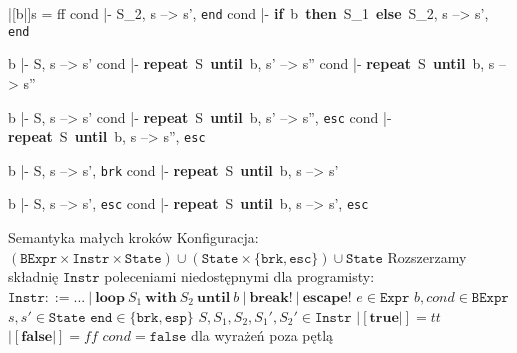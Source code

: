 \documentclass[12pt]{minimal}
\begin{document}
\vspace{5mm}
\inference
{|[b|]s = ff \quad cond |- S_2, s --> s', \texttt{end}}
{cond |- \textbf{if}~b~\textbf{then}~S_1~\textbf{else}~S_2, s --> s', \texttt{end}}

\vspace{5mm}
\inference
{b |- S, s --> s' \quad cond |- \textbf{repeat}~S~\textbf{until}~b, s' --> s''}
{cond |- \textbf{repeat}~S~\textbf{until}~b, s --> s''}

\vspace{5mm}
\inference
{b |- S, s --> s' \quad cond |- \textbf{repeat}~S~\textbf{until}~b, s' --> s'', \texttt{esc}}
{cond |- \textbf{repeat}~S~\textbf{until}~b, s --> s'', \texttt{esc}}

\vspace{5mm}
\inference
{b |- S, s --> s', \texttt{brk}}
{cond |- \textbf{repeat}~S~\textbf{until}~b, s --> s'}

\vspace{5mm}
\inference
{b |- S, s --> s', \texttt{esc}}
{cond |- \textbf{repeat}~S~\textbf{until}~b, s --> s', \texttt{esc}}

\vspace{5mm}

\vspace{5mm}


\vspace{20mm}

{\Huge Semantyka małych kroków}
\newline\newline
Konfiguracja:
$(\texttt{BExpr} \times \texttt{Instr} \times \texttt{State}) 
\cup (\texttt{State} \times \{\texttt{brk}, \texttt{esc}\})
\cup \texttt{State}$ \newline
Rozszerzamy składnię $\texttt{Instr}$ poleceniami niedostępnymi dla programisty:\newline
$\texttt{Instr} ::= ...~|~\textbf{loop}~S_1~\textbf{with}~S_2~\textbf{until}~b~|~\textbf{break!}~|~\textbf{escape!}$\newline\newline
$e \in \texttt{Expr}$ \newline
$b, cond \in \texttt{BExpr}$ \newline
$s, s' \in \texttt{State}$ \newline
$\texttt{end} \in \{\texttt{brk}, \texttt{esp}\}$ \newline
$S, S_1, S_2, S_1', S_2' \in \texttt{Instr}$ \newline
$|[\textbf{true}|] = tt$ \newline
$|[\textbf{false}|] = ff$ \newline
\newline
$cond = \texttt{false}$ dla wyrażeń poza pętlą
\end{document}
